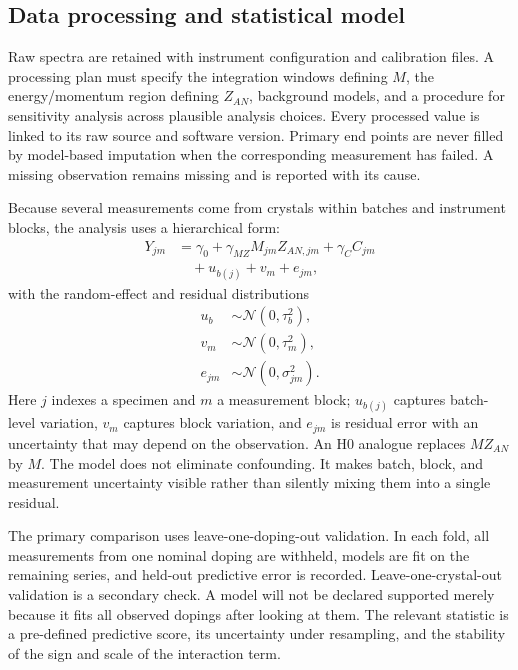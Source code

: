 \documentclass[conference]{IEEEtran}
\begin{document}
\subsection{Data processing and statistical model}

Raw spectra are retained with instrument configuration and calibration files. A processing plan must specify the integration windows defining $M$, the energy/momentum region defining $Z_{AN}$, background models, and a procedure for sensitivity analysis across plausible analysis choices. Every processed value is linked to its raw source and software version. Primary end points are never filled by model-based imputation when the corresponding measurement has failed. A missing observation remains missing and is reported with its cause.

Because several measurements come from crystals within batches and instrument blocks, the analysis uses a hierarchical form:
\begin{align}
Y_{j m} &= \gamma_0+\gamma_{MZ}M_{j m}Z_{AN,jm}+\gamma_C C_{jm}\nonumber\\
&\quad +u_{b(j)}+v_{m}+e_{jm},\label{eq:hierarchical}
\end{align}
with the random-effect and residual distributions
\begin{align}
u_{b} &\sim \mathcal{N}(0,\tau_{b}^{2}),\nonumber\\
v_m &\sim \mathcal{N}(0,\tau_{m}^{2}),\nonumber\\
e_{jm} &\sim \mathcal{N}(0,\sigma_{jm}^{2}).\label{eq:randomeffects}
\end{align}
Here $j$ indexes a specimen and $m$ a measurement block; $u_{b(j)}$ captures batch-level variation, $v_m$ captures block variation, and $e_{jm}$ is residual error with an uncertainty that may depend on the observation. An H0 analogue replaces $MZ_{AN}$ by $M$. The model does not eliminate confounding. It makes batch, block, and measurement uncertainty visible rather than silently mixing them into a single residual.

The primary comparison uses leave-one-doping-out validation. In each fold, all measurements from one nominal doping are withheld, models are fit on the remaining series, and held-out predictive error is recorded. Leave-one-crystal-out validation is a secondary check. A model will not be declared supported merely because it fits all observed dopings after looking at them. The relevant statistic is a pre-defined predictive score, its uncertainty under resampling, and the stability of the sign and scale of the interaction term.
\end{document}
